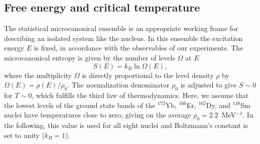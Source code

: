 \begin{multicols}{2}
\section{Free energy and critical temperature}

The statistical microcanonical ensemble is an appropriate working frame for 
describing an isolated system like the nucleus. In this ensemble the excitation
energy $E$ is fixed, in accordance with the observables of our experiments. The
microcanonical entropy is given by the number of levels $\Omega$ at $E$
\begin{equation}
S(E)=k_B\ln\Omega(E),
\label{eq:S(E)}
\end{equation}
where the multiplicity $\Omega$ is directly proportional to the level density 
$\rho$ by $\Omega(E)=\rho(E)/\rho_0$. The normalization denominator $\rho_0$ is
adjusted to give $S\sim 0$ for $T \sim 0$, which fulfills the third law of 
thermodynamics. Here, we assume that the lowest levels of the ground state 
bands of the $^{172}$Yb, $^{166}$Er, $^{162}$Dy, and $^{148}$Sm nuclei have 
temperatures close to zero, giving on the average $\rho_0=2.2$~MeV$^{-1}$. In 
the following, this value is used for all eight nuclei and Boltzmann's constant
is set to unity ($k_B=1$).


\end{multicols}
